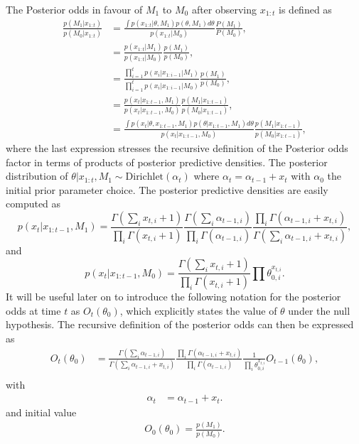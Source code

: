 \documentclass[11pt]{article}
\begin{document}
The Posterior odds in favour of $M_1$ to $M_0$ after observing $x_{1:t}$ is defined as
\begin{align}
  \label{eq:general_posterior_odds}
  \frac{p(M_1|x_{1:t})}{p(M_0|x_{1:t})}  &= \frac{\int p(x_{1:t}|\theta,M_1)p(\theta,M_1)d\theta}{p(x_{1:t}|M_0)}\frac{P(M_1)}{P(M_0)},\\
                      &=\frac{p(x_{1:t}|M_1)}{p(x_{1:t}|M_0)}\frac{p(M_1)}{p(M_0)},\\
                      &=\frac{\prod_{i=1}^{t}p(x_i|x_{1:i-1}|M_1)}{\prod_{i=1}^{t}p(x_i|x_{1:i-1}|M_0)}\frac{p(M_1)}{p(M_0)},\\
                      &=\frac{p(x_t|x_{1:t-1},M_1)}{p(x_t|x_{1:t-1},M_0)} \frac{p(M_1|x_{1:t-1})}{p(M_0|x_{1:t-1})},\\
    &=\frac{\int p(x_t|\theta,x_{1:t-1},M_1)p(\theta|x_{1:t-1},M_1)d\theta}{p(x_t|x_{1:t-1},M_0)}  \frac{p(M_1|x_{1:t-1})}{p(M_0|x_{1:t-1})} ,
\end{align}
where the last expression stresses the recursive definition of the Posterior odds factor in terms of products of posterior predictive densities. The posterior distribution of $\theta| x_{1:t}, M_1 \sim \text{Dirichlet}(\alpha_t)$ where $\alpha_t = \alpha_{t-1}+x_t$ with $\alpha_0$ the initial prior parameter choice. The posterior predictive densities are easily computed as
\begin{equation}
  \label{eq:posterior_predictive_m1}
   p(x_t|x_{1:t-1},M_1) = \frac{ \Gamma(\sum_i x_{t,i}+ 1)}{\prod_i \Gamma(x_{t,i} + 1)} \frac{\Gamma(\sum_i \alpha_{t-1,i})}{\prod_i \Gamma(\alpha_{t-1,i})} \frac{\prod_i \Gamma(\alpha_{t-1,i} + x_{t,i})}{\Gamma(\sum_i \alpha_{t-1,i} + x_{t,i})},
\end{equation}
and
\begin{equation}
  \label{eq:posterior_predictive_m2}
   p(x_t|x_{1:t-1},M_0) = \frac{ \Gamma(\sum_i x_{t,i} + 1)}{\prod_i \Gamma(x_{t,i} + 1)} \prod \theta_{0,i}^{x_{t,i}}.
 \end{equation}
 It will be useful later on to introduce the following notation for the posterior odds at time $t$ as $O_t(\theta_0)$, which explicitly states the value of $\theta$ under the null hypothesis. The recursive definition of the posterior odds can then be expressed as
\begin{align}
  O_{t}(\theta_0) &= \frac{\Gamma(\sum_i \alpha_{t-1,i})}{\Gamma(\sum_i \alpha_{t-1,i} +  x_{t,i})} \frac{\prod_i \Gamma(\alpha_{t-1,i} + x_{t,i})}{\prod_i \Gamma(\alpha_{t-1,i})} \frac{1}{\prod_i \theta_{0,i}^{x_{t,i}}}  O_{t-1}(\theta_0),\\
\end{align}
with
\begin{align}
  \label{eq:alpha_update}
  \alpha_{t}&= \alpha_{t-1}+x_t.
\end{align}
and initial value
\begin{align}
  \label{eq:bayes_factor_seed}
O_0(\theta_0) = \frac{p(M_1)}{p(M_0)}.
\end{align}
\end{document}
